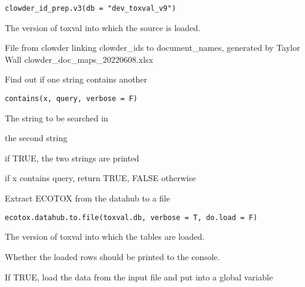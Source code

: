 \documentclass[letterpaper]{book}
\begin{document}
%
\begin{Usage}
\begin{verbatim}
clowder_id_prep.v3(db = "dev_toxval_v9")
\end{verbatim}
\end{Usage}
%
\begin{Arguments}
\begin{ldescription}
\item[\code{db}] The version of toxval into which the source is loaded.

File from clowder linking clowder\_ids to document\_names, generated by Taylor Wall
clowder\_doc\_maps\_20220608.xlsx
\end{ldescription}
\end{Arguments}
%
\begin{Description}\relax
Find out if one string contains another
\end{Description}
%
\begin{Usage}
\begin{verbatim}
contains(x, query, verbose = F)
\end{verbatim}
\end{Usage}
%
\begin{Arguments}
\begin{ldescription}
\item[\code{x}] The string to be searched in

\item[\code{query}] the second string

\item[\code{verbose}] if TRUE, the two strings are printed
\end{ldescription}
\end{Arguments}
%
\begin{Value}
if x contains query, return TRUE, FALSE otherwise
\end{Value}
%
\begin{Description}\relax
Extract ECOTOX from the datahub to a file
\end{Description}
%
\begin{Usage}
\begin{verbatim}
ecotox.datahub.to.file(toxval.db, verbose = T, do.load = F)
\end{verbatim}
\end{Usage}
%
\begin{Arguments}
\begin{ldescription}
\item[\code{toxval.db}] The version of toxval into which the tables are loaded.

\item[\code{verbose}] Whether the loaded rows should be printed to the console.

\item[\code{do.load}] If TRUE, load the data from the input file and put into a global variable
\end{ldescription}
\end{Arguments}
\end{document}
